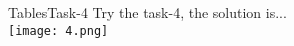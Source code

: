 \begin{frame}{Tables}{Task-4}
    Try the task-4, the solution is...\\ \pause
    \vspace{1em}
    \texttt{[image: 4.png]}
\end{frame}
